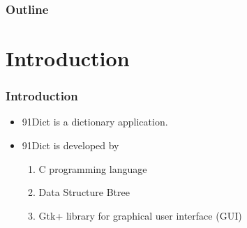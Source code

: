 \begin{frame}
\frametitle{Outline} %
\tableofcontents %
\end{frame}


\section{Introduction} %


\begin{frame}
\frametitle{Introduction}
\begin{itemize}
  \item 91Dict is a dictionary application.
  \item 91Dict is developed by
  \begin{enumerate}[1.]
    \item C programming language
    \item Data Structure Btree 
    \item Gtk+ library for graphical user interface (GUI)
  \end{enumerate}
\end{itemize}
\end{frame}

